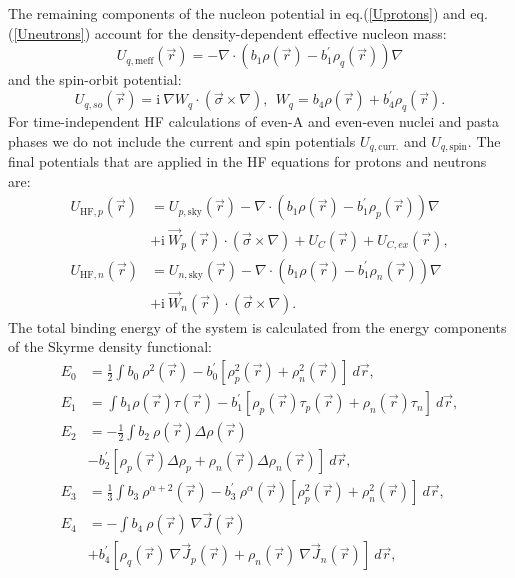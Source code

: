 \documentclass[4p]{elsarticle}
\begin{document}
The remaining components of the nucleon potential in eq.(\ref{Uprotons}) and eq.(\ref{Uneutrons}) account for the density-dependent effective nucleon mass:
\begin{equation}
U_{q,\mathrm{meff}} (\vec{r}) =  - \nabla \cdot \left( b_1 \rho (\vec{r}) - b^{\prime}_1 \rho_q (\vec{r}) \right) \nabla
\label{Umeff}
\end{equation}
and the spin-orbit potential:
\begin{equation} 
U_{q,so} (\vec{r}) = \mathrm{i} \: \nabla W_q \cdot \left( \vec{\sigma} \times \nabla \right), \:\: W_q = b_4 \rho (\vec{r}) + b_4^\prime \rho_q (\vec{r}).
\label{Uso}
\end{equation}
For time-independent HF calculations of even-A and even-even nuclei and pasta phases we do not include the current and spin potentials $U_{q, \mathrm{curr.}}$ and $U_{q, \mathrm{spin}}$. The final potentials that are applied in the HF equations for protons and neutrons are:
\begin{align}
U_{\mathrm{HF},p} (\vec{r}) &=  U_{p,\mathrm{sky}}(\vec{r}) - \nabla \cdot \left( b_1 \rho (\vec{r}) - b^{\prime}_1 \rho_p (\vec{r}) \right) \nabla \nonumber\\
& + \mathrm{i} \: \vec{W}_p (\vec{r}) \cdot (\vec{\sigma} \times \nabla )+ U_{C}(\vec{r}) + U_{C,ex}(\vec{r}) , \\
U_{\mathrm{HF},n} (\vec{r}) &=  U_{n,\mathrm{sky}}(\vec{r}) - \nabla \cdot \left( b_1 \rho (\vec{r}) - b^{\prime}_1 \rho_n (\vec{r}) \right) \nabla \nonumber\\
&+ \mathrm{i} \: \vec{W}_n (\vec{r}) \cdot (\vec{\sigma} \times \nabla ).
\end{align}
The total binding energy of the system is calculated from the energy components of the Skyrme density functional: 
\begin{align}
E_0 &= \frac{1}{2} \int  b_0 \: \rho^2 (\vec{r}) - b^{\prime}_0 \left[ \rho_p^2 (\vec{r}) + \rho_n^2 (\vec{r}) \right] \: d \vec{r} , \\ 
E_1 &=  \int  b_1 \rho (\vec{r}) \tau (\vec{r}) - b^{\prime}_1 \left[\rho_p (\vec{r}) \tau_p (\vec{r}) + \rho_n (\vec{r}) \tau_n \right] \: d \vec{r} , 
\label{energy01}\\
E_2 &=  - \frac{1}{2} \int  b_2  \: \rho (\vec{r}) \Delta \rho (\vec{r}) \nonumber\\
& - b^{\prime}_2 \left[ \rho_p (\vec{r}) \Delta \rho_p + \rho_n (\vec{r}) \Delta \rho_n (\vec{r}) \right]   \: d \vec{r} , \\
E_3 &= \frac{1}{3} \int b_3 \: \rho^{\alpha + 2} (\vec{r}) - b^{\prime}_3 \: \rho^{\alpha} (\vec{r}) \left[ \rho_p^2 (\vec{r}) + \rho_n^2 (\vec{r}) \right]  \: d \vec{r} , 
\label{energy23}\\
E_4 &= - \int  b_4 \: \rho (\vec{r}) \: \nabla \vec{J} (\vec{r}) \nonumber\\
&+ b^{\prime}_4 \left[ \rho_q (\vec{r})  \: \nabla \vec{J}_p (\vec{r}) +  \rho_n (\vec{r})  \: \nabla \vec{J}_n (\vec{r}) \right] \:  d \vec{r} , 
\label{energy4}
\end{align}
\end{document}
